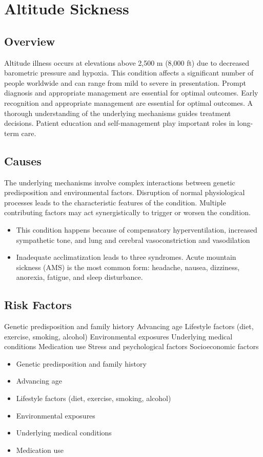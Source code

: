 \chapter{Altitude Sickness}
\label{sec:Altitude Sickness}

\section{Overview}
Altitude illness occurs at elevations above 2,500 m (8,000 ft) due to decreased barometric pressure and hypoxia. This condition affects a significant number of people worldwide and can range from mild to severe in presentation. Prompt diagnosis and appropriate management are essential for optimal outcomes. Early recognition and appropriate management are essential for optimal outcomes. A thorough understanding of the underlying mechanisms guides treatment decisions. Patient education and self-management play important roles in long-term care.
\section{Causes}
The underlying mechanisms involve complex interactions between genetic predisposition and environmental factors. Disruption of normal physiological processes leads to the characteristic features of the condition. Multiple contributing factors may act synergistically to trigger or worsen the condition.

\begin{itemize}[noitemsep]
  \item This condition happens because of compensatory hyperventilation, increased sympathetic tone, and lung and cerebral vasoconstriction and vasodilation
  \item Inadequate acclimatization leads to three syndromes. Acute mountain sickness (AMS) is the most common form: headache, nausea, dizziness, anorexia, fatigue, and sleep disturbance.
\end{itemize}
\section{Risk Factors}
Genetic predisposition and family history Advancing age Lifestyle factors (diet, exercise, smoking, alcohol) Environmental exposures Underlying medical conditions Medication use Stress and psychological factors Socioeconomic factors

\begin{itemize}[noitemsep]
  \item Genetic predisposition and family history
  \item Advancing age
  \item Lifestyle factors (diet, exercise, smoking, alcohol)
  \item Environmental exposures
  \item Underlying medical conditions
  \item Medication use
\end{itemize}
